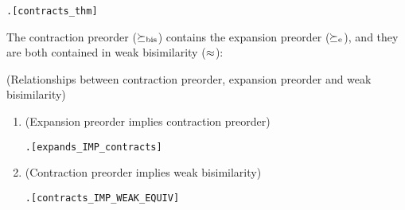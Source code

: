 \begin{alltt}
\HOLTokenTurnstile{}  \HOLSymConst{\HOLTokenContracts{}}  \HOLSymConst{\HOLTokenEquiv{}} \HOLSymConst{\HOLTokenExists{}}.    \HOLSymConst{\HOLTokenConj{}}  \hfill{[contracts_thm]}
\end{alltt}

The contraction preorder ($\mathrel{\succeq_{\rm{bis}}}$) contains the expansion
preorder ($\mathrel{\succeq_{\rm{e}}}$), and they are both contained in weak bisimilarity ($\approx$):
\begin{proposition}{(Relationships between contraction preorder,
    expansion preorder and weak bisimilarity)}
\begin{enumerate}
\item (Expansion preorder implies contraction preorder)
\begin{alltt}
\HOLTokenTurnstile{} \HOLSymConst{\HOLTokenForall{}} .  \HOLSymConst{\HOLTokenExpands{}}  \HOLSymConst{\HOLTokenImp{}}  \HOLSymConst{\HOLTokenContracts{}} \hfill[expands_IMP_contracts]
\end{alltt}
\item (Contraction preorder implies weak bisimilarity)
\begin{alltt}
\HOLTokenTurnstile{} \HOLSymConst{\HOLTokenForall{}} .  \HOLSymConst{\HOLTokenContracts{}}  \HOLSymConst{\HOLTokenImp{}}  \HOLSymConst{\HOLTokenWeakEQ} \hfill[contracts_IMP_WEAK_EQUIV]
\end{alltt}
\end{enumerate}
\end{proposition}

